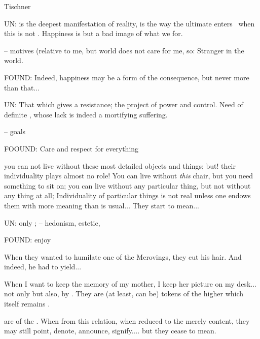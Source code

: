 Tischner


\ad{\mine }
UN:  is the deepest manifestation of reality, is the way the ultimate
enters \hoa\ when this is not . 
Happiness is but a bad image of what we  for.

-- motives (relative to me, but world does not care for me, so: Stranger in the world.


FOUND: Indeed, happiness may
be a form of the consequence, but never more than that...


\ad{\act}
UN: That which gives a resistance; the project of power and control. Need of
definite , whose lack is indeed a mortifying suffering.

-- goals

FOOUND: Care and respect for everything


you can not live without these most detailed objects and things; but! their
individuality plays almost no role! You can live without {\em this} chair, but
you need something to sit on; you can live without any particular thing, but not
without any thing at all; Individuality of particular things is not real unless
one endows them with more meaning than is usual... They start to mean...

\ad{\imm}
UN: only \herenow; -- hedonism, estetic, 

FOUND: enjoy


\tsep{}


When they wanted to humilate one of the Merovings, they cut his hair.
And indeed, he had to yield...

When I want to keep the memory of my mother, I keep her picture on my
desk...  not only  but also, by
 . They are (at least, can be) tokens of the
higher which itself remains .

 are  of the .
When  from this relation, when reduced to the merely
 content, they 
may still point, denote, announce, signify.... but they cease to mean. 

